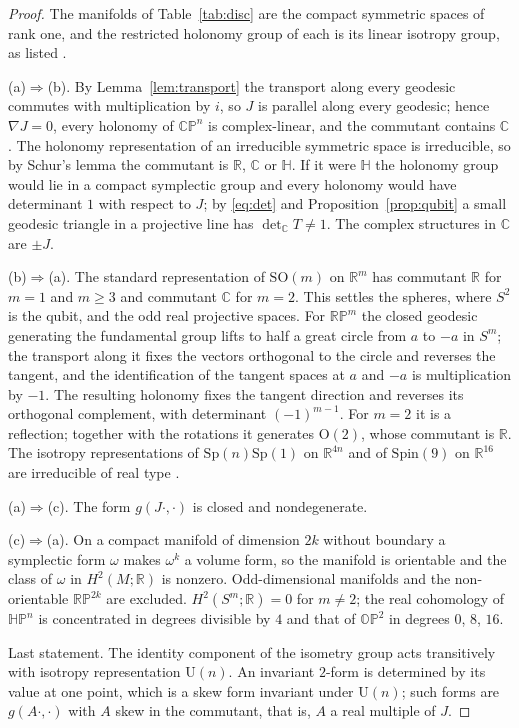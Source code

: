 \begin{proof}
The manifolds of Table~\ref{tab:disc} are the compact symmetric spaces of rank one, and the restricted holonomy group of each is its linear isotropy group, as listed \cite{berger,besse}.

(a)$\Rightarrow$(b). By Lemma~\ref{lem:transport} the transport along every geodesic commutes with multiplication by $i$, so $J$ is parallel along every geodesic; hence $\nabla J=0$, every holonomy of $\mathbb{CP}^n$ is complex-linear, and the commutant contains $\mathbb{C}$. The holonomy representation of an irreducible symmetric space is irreducible, so by Schur's lemma the commutant is $\mathbb{R}$, $\mathbb{C}$ or $\mathbb{H}$. If it were $\mathbb{H}$ the holonomy group would lie in a compact symplectic group and every holonomy would have determinant $1$ with respect to $J$; by \eqref{eq:det} and Proposition~\ref{prop:qubit} a small geodesic triangle in a projective line has $\det_{\mathbb{C}}T\neq1$. The complex structures in $\mathbb{C}$ are $\pm J$.

(b)$\Rightarrow$(a). The standard representation of $\mathrm{SO}(m)$ on $\mathbb{R}^m$ has commutant $\mathbb{R}$ for $m=1$ and $m\ge3$ and commutant $\mathbb{C}$ for $m=2$. This settles the spheres, where $S^2$ is the qubit, and the odd real projective spaces. For $\mathbb{RP}^m$ the closed geodesic generating the fundamental group lifts to half a great circle from $a$ to $-a$ in $S^m$; the transport along it fixes the vectors orthogonal to the circle and reverses the tangent, and the identification of the tangent spaces at $a$ and $-a$ is multiplication by $-1$. The resulting holonomy fixes the tangent direction and reverses its orthogonal complement, with determinant $(-1)^{m-1}$. For $m=2$ it is a reflection; together with the rotations it generates $\mathrm{O}(2)$, whose commutant is $\mathbb{R}$. The isotropy representations of $\mathrm{Sp}(n)\mathrm{Sp}(1)$ on $\mathbb{R}^{4n}$ and of $\mathrm{Spin}(9)$ on $\mathbb{R}^{16}$ are irreducible of real type \cite{besse}.

(a)$\Rightarrow$(c). The form $g(J\cdot,\cdot)$ is closed and nondegenerate.

(c)$\Rightarrow$(a). On a compact manifold of dimension $2k$ without boundary a symplectic form $\omega$ makes $\omega^k$ a volume form, so the manifold is orientable and the class of $\omega$ in $H^2(M;\mathbb{R})$ is nonzero. Odd-dimensional manifolds and the non-orientable $\mathbb{RP}^{2k}$ are excluded. $H^2(S^m;\mathbb{R})=0$ for $m\neq2$; the real cohomology of $\mathbb{HP}^n$ is concentrated in degrees divisible by $4$ and that of $\mathbb{OP}^2$ in degrees $0$, $8$, $16$.

Last statement. The identity component of the isometry group acts transitively with isotropy representation $\mathrm{U}(n)$. An invariant $2$-form is determined by its value at one point, which is a skew form invariant under $\mathrm{U}(n)$; such forms are $g(A\cdot,\cdot)$ with $A$ skew in the commutant, that is, $A$ a real multiple of $J$.
\end{proof}

